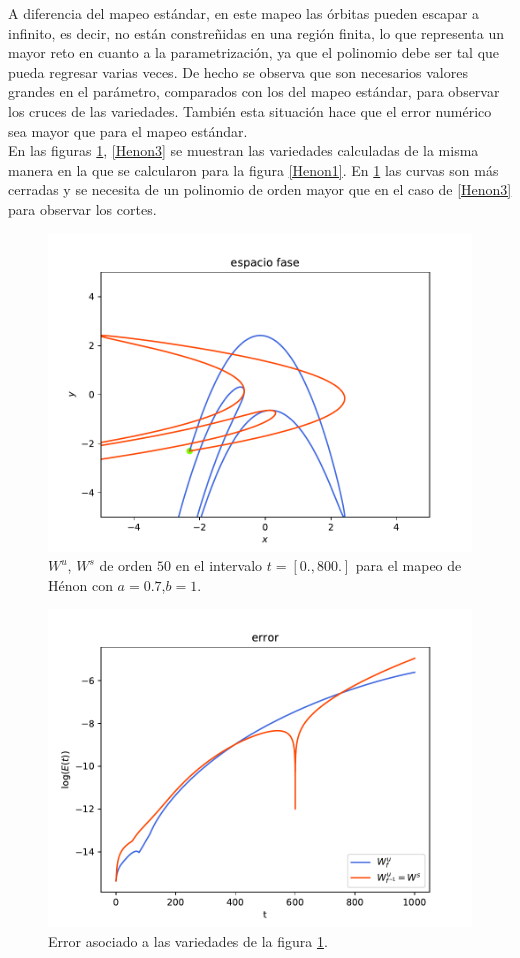 A diferencia del mapeo estándar, en este mapeo las órbitas pueden escapar a infinito, es decir, no están  constreñidas en una región finita, lo que representa un mayor reto en cuanto a la parametrización, ya que el polinomio debe ser tal que pueda regresar varias veces. De hecho se observa que son necesarios valores grandes en el parámetro, comparados con los del mapeo estándar, para observar los cruces de las variedades. También esta situación hace que el error numérico sea mayor que para el mapeo estándar. \\

En las figuras \ref{Henon2}, \ref{Henon3} se muestran las variedades calculadas de la misma manera en la que se calcularon para la figura \ref{Henon1}. En \ref{Henon2} las curvas son más cerradas y se necesita de un polinomio de orden mayor que en el caso de \ref{Henon3} para observar los cortes. 
\begin{figure}[H]
\centering
\includegraphics[scale=0.7]{h07}
\caption{$W^{u}$, $W^{s}$ de orden $50$ en el intervalo $t=[0.,800.]$ para el mapeo de Hénon con $a=0.7$,$b=1.$}
\label{Henon2}
\end{figure}

\begin{figure}[H]
\centering
\includegraphics[scale=0.7]{errorH07}
\caption{Error asociado a las variedades de la figura \ref{Henon2}.}
\label{ErrorHenon2}
\end{figure}



